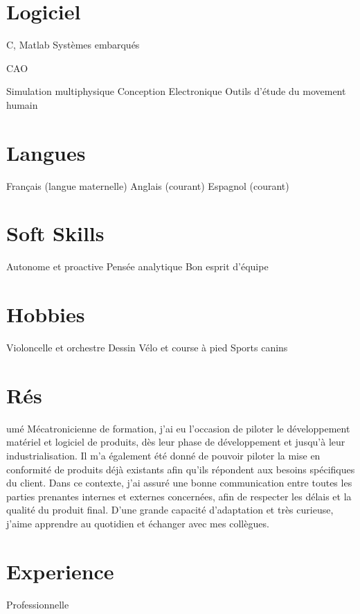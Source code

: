 \documentclass{cv-style}     %
\begin{document}
\begin{aside}
    \section{Logiciel}
    C, Matlab
    Systèmes embarqués %

    CAO %

    Simulation multiphysique %
    Conception Electronique %
    Outils d’étude du movement humain %
    \section{Langues}
    Français (langue maternelle)
    Anglais (courant)
    Espagnol (courant)
    \section{Soft Skills}
    Autonome et proactive
    Pensée analytique
    Bon esprit d'équipe
    \section{Hobbies}
    Violoncelle et orchestre
    Dessin
    Vélo et course à pied
    Sports canins
\end{aside}

\section{Rés}{umé}
Mécatronicienne de formation, j’ai eu l’occasion de piloter le développement matériel et logiciel de produits, 
dès leur phase de développement et jusqu'à leur industrialisation. Il m'a également été donné de pouvoir piloter la mise en conformité de produits 
déjà existants afin qu'ils répondent aux besoins spécifiques du client.
Dans ce contexte, j'ai assuré une bonne communication entre toutes les parties prenantes internes et externes concernées, 
afin de respecter les délais et la qualité du produit final.
D'une grande capacité d'adaptation et très curieuse, j’aime apprendre au quotidien et échanger avec mes collègues.

\section{Experience}{ Professionnelle}
\end{document}
